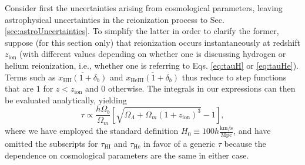 \documentclass[twocolumn,aps,prd,nofootinbib,showpacs,superscriptaddress]{revtex4-1}
\begin{document}
Consider first the uncertainties arising from cosmological parameters, leaving astrophysical uncertainties in the reionization process to Sec. \ref{sec:astroUncertainties}. To simplify the latter in order to clarify the former, suppose (for this section only) that reionization occurs instantaneously at redshift $z_\textrm{ion}$ (with different values depending on whether one is discussing hydrogen or helium reionization, i.e., whether one is referring to Eqs. \ref{eq:tauH} or \ref{eq:tauHe}). Terms such as $\overline{x_\textrm{HII} (1+\delta_b)}$ and $\overline{x_\textrm{HeIII} (1+\delta_b)}$ thus reduce to step functions that are $1$ for $z<z_\textrm{ion}$ and $0$ otherwise. The integrals in our expressions can then be evaluated analytically, yielding
\begin{equation}
\label{eq:exactConstant}
\tau \propto \frac{h \Omega_b }{\Omega_m} \left[ \sqrt{\Omega_\Lambda + \Omega_m (1+z_\textrm{ion})^3} - 1 \right],
\end{equation}
where we have employed the standard definition $H_0 \equiv 100h \frac{\textrm{km}/\textrm{s}}{\textrm{Mpc}}$, and have omitted the subscripts for $\tau_\textrm{HI}$ and $\tau_\textrm{He}$ in favor of a generic $\tau$ because the dependence on cosmological parameters are the same in either case.
\end{document}
